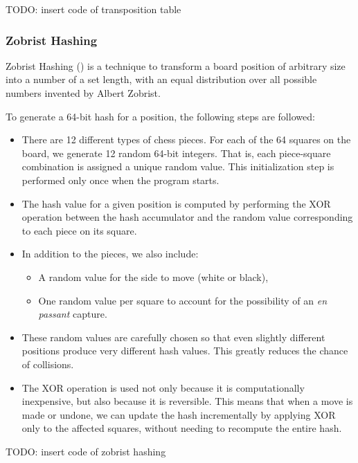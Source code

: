 \vspace{1em}

TODO: insert code of transposition table

\subsubsection{Zobrist Hashing}

Zobrist Hashing (\cite{ZobristHashing}) is a technique to transform a board position of arbitrary size into a number of a set length, with an equal distribution over all possible numbers invented by Albert Zobrist.

\vspace{1em}

\noindent To generate a 64-bit hash for a position, the following steps are followed:

\begin{itemize}
  \item There are 12 different types of chess pieces. For each of the 64 squares on the board, we generate 12 random 64-bit integers. That is, each piece-square combination is assigned a unique random value. This initialization step is performed only once when the program starts.
  \item The hash value for a given position is computed by performing the XOR operation between the hash accumulator and the random value corresponding to each piece on its square.
  \item In addition to the pieces, we also include:
  \begin{itemize}
    \item A random value for the side to move (white or black),
    \item One random value per square to account for the possibility of an \textit{en passant} capture.
  \end{itemize}
  \item These random values are carefully chosen so that even slightly different positions produce very different hash values. This greatly reduces the chance of collisions.
  \item The XOR operation is used not only because it is computationally inexpensive, but also because it is reversible. This means that when a move is made or undone, we can update the hash incrementally by applying XOR only to the affected squares, without needing to recompute the entire hash.
\end{itemize}

TODO: insert code of zobrist hashing

